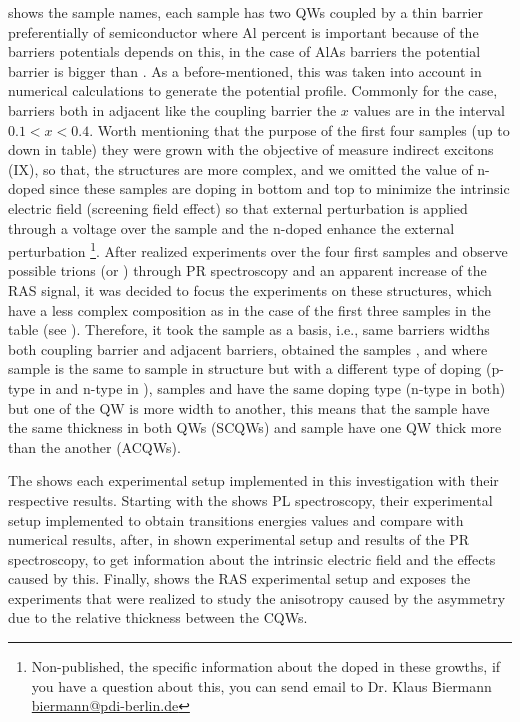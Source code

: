  shows the sample names, each sample has two QWs coupled by a thin barrier preferentially of \algaas semiconductor where Al percent is important because of the barriers potentials depends on this, in the case of AlAs barriers the potential barrier is bigger than \algaas. As a before-mentioned, this was taken into account in numerical calculations to generate the potential profile. Commonly for the case, \algaas barriers both in adjacent like the coupling barrier the $x$ values are in the interval $0.1<x<0.4$. Worth mentioning that the purpose of the first four samples (up to down in table) they were grown with the objective of measure indirect excitons (IX), so that,  the structures are more complex, and we omitted the value of n-doped since these samples are doping in bottom and top to minimize the intrinsic electric field (screening field effect) so that external perturbation is applied through a voltage over the sample\cite{yuan2018tunneling} and the n-doped enhance the external perturbation \footnote{Non-published, the specific information about the doped  in these growths, if you have a question about this, you can send email to Dr. Klaus Biermann \url{biermann@pdi-berlin.de}}. After realized experiments over the four first samples and observe possible trions  (\xp or \xm)  through \gls{PR} spectroscopy and an apparent increase of the RAS signal, it was decided to focus the experiments on these structures, which have a less complex composition as in the case of the first three samples in the table (see ). Therefore,  it took the sample \tucu as a  basis, i.e., same barriers widths both coupling barrier and adjacent barriers, obtained the samples \tcvu, \tcvd and \tcvt where sample \tcvd is the same to sample \tcvu in structure but with a different type of doping (p-type in \tcvd and n-type in \tcvu), samples \tcvu and \tcvd have the same doping type (n-type in both) but one of the QW is more width to another, this means that the sample \tcvt have the same thickness in both QWs (SCQWs) and sample \tcvu have one  QW  thick more than the another (ACQWs). 

The   shows each experimental setup implemented in this investigation with their respective results. Starting with the   shows PL spectroscopy, their experimental setup implemented to obtain transitions energies values and compare with numerical results, after,  in  shown experimental setup and results of the PR spectroscopy, to get information about the intrinsic electric field and the effects caused by this. Finally,   shows the RAS experimental setup and exposes the experiments that were realized to study the anisotropy caused by the asymmetry due to the relative thickness between the CQWs.

